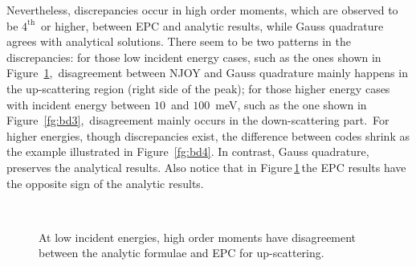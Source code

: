 \documentclass[review]{elsarticle}
\begin{document}
Nevertheless, discrepancies occur in high order moments, which are observed to be $4^\mathrm{th}$~or higher, between EPC and analytic results, while Gauss quadrature agrees with analytical solutions. There seem to be two patterns in the discrepancies: for those low incident energy cases, such as the ones shown in Figure~\ref{fg:bdlow},~disagreement between NJOY and Gauss quadrature mainly happens in the up-scattering region (right side of the peak); for those higher energy cases with incident energy between $10$~and $100$~meV, such as the one shown in Figure~\ref{fg:bd3},~disagreement mainly occurs in the down-scattering part.~For higher energies, though discrepancies exist, the difference between codes shrink as the example illustrated in Figure~\ref{fg:bd4}. In contrast, Gauss quadrature, preserves the analytical results. Also notice that in Figure\,\ref{fg:bdlow}\,the EPC results have the opposite sign of the analytic results. %

\begin{figure}[ht!]
	\centering
	~
	\caption{At low incident energies, high order moments have disagreement between the analytic formulae and EPC for  up-scattering.}
	\label{fg:bdlow}
\end{figure}
\end{document}
